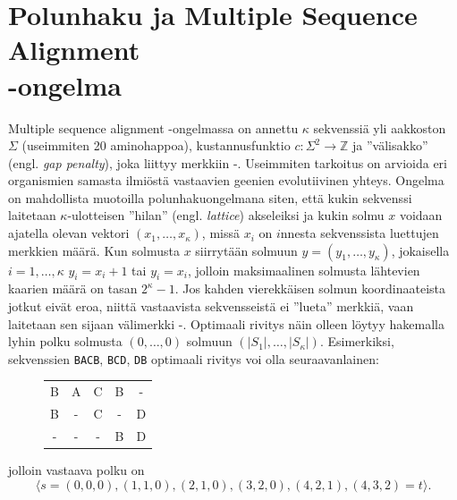 \documentclass[finnish]{tktltiki2}
\theoremstyle{definition}
\theoremstyle{remark}
\begin{document}
\section{Polunhaku ja Multiple Sequence Alignment \\-ongelma}
Multiple sequence alignment -ongelmassa on annettu $\kappa$ sekvenssiä yli aakkoston $\Sigma$ (useimmiten 20 aminohappoa), kustannusfunktio $c \colon \Sigma^2 \to \mathbb{Z}$ ja ''välisakko'' (engl. \textit{gap penalty}), joka liittyy merkkiin -. Useimmiten tarkoitus on arvioida eri organismien samasta ilmiöstä vastaavien geenien evolutiivinen yhteys.  Ongelma on mahdollista muotoilla polunhakuongelmana siten, että kukin sekvenssi laitetaan $\kappa$-ulotteisen ''hilan'' (engl. \textit{lattice}) akseleiksi ja kukin solmu $x$ voidaan ajatella olevan vektori $(x_1, \dots, x_\kappa)$, missä $x_i$ on $i$nnesta sekvenssista luettujen merkkien määrä. Kun solmusta $x$ siirrytään solmuun $y = (y_1, \dots, y_\kappa)$, jokaisella $i = 1, \dots, \kappa$ $y_i = x_i + 1$ tai $y_i = x_i$, jolloin maksimaalinen solmusta lähtevien kaarien määrä on tasan $2^\kappa - 1$. Jos kahden vierekkäisen solmun koordinaateista jotkut eivät eroa, niittä vastaavista sekvensseistä ei ''lueta'' merkkiä, vaan laitetaan sen sijaan välimerkki -. Optimaali rivitys näin olleen löytyy hakemalla lyhin polku solmusta $(0, \dots, 0)$ solmuun $(|S_1|, \dots, |S_\kappa|)$. Esimerkiksi, sekvenssien \texttt{BACB}, \texttt{BCD}, \texttt{DB} optimaali rivitys voi olla seuraavanlainen:
\begin{figure}[H]
\centering
\begin{tabular}{ccccc}
B & A & C & B & - \\
B & - & C & - & D \\
- & - & - & B & D
\end{tabular}
\end{figure}
jolloin vastaava polku on
\[ 
\langle s = (0, 0, 0), (1, 1, 0), (2, 1, 0), (3, 2, 0), (4, 2, 1), (4, 3, 2) = t \rangle.
\]
\end{document}
